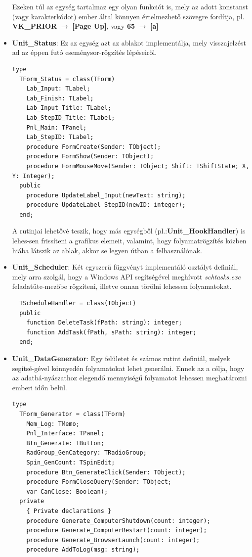 \begin{itemize}
{Ezeken túl az egység tartalmaz egy olyan funkciót is, mely az adott konstanst (vagy karakterkódot) ember által könnyen értelmezhető szövegre fordítja, pl. \textbf{VK\_PRIOR} $\rightarrow$ \textbf{[Page Up]}, vagy \textbf{65} $\rightarrow$ \textbf{[a]}

	}
	\item{
		\textbf{Unit\_Status}: Ez az egység azt az ablakot implementálja, mely visszajelzést ad az éppen futó eseménysor-rögzítés lépéseiről.
		\begin{lstlisting}
type
  TForm_Status = class(TForm)
    Lab_Input: TLabel;
    Lab_Finish: TLabel;
    Lab_Input_Title: TLabel;
    Lab_StepID_Title: TLabel;
    Pnl_Main: TPanel;
    Lab_StepID: TLabel;
    procedure FormCreate(Sender: TObject);
    procedure FormShow(Sender: TObject);
    procedure FormMouseMove(Sender: TObject; Shift: TShiftState; X, Y: Integer);
  public
    procedure UpdateLabel_Input(newText: string);
    procedure UpdateLabel_StepID(newID: integer);
  end;
		\end{lstlisting}

A rutinjai lehetővé teszik, hogy más egységből (pl.:\textbf{Unit\_HookHandler}) is lehes\hyp{}sen frissíteni a grafikus elemeit, valamint, hogy folyamatrögzítés közben hiába látszik az ablak, akkor se legyen útban a felhasználónak.
	}
	\item{
		\textbf{Unit\_Scheduler}: Két egyszerű függvényt implementáló osztályt definiál, mely arra szolgál, hogy a Windows API segítségével meghívott \textit{schtasks.exe} feladatüte\hyp{}mezőbe rögzíteni, illetve onnan törölni lehessen folyamatokat.
	\begin{lstlisting}
  TScheduleHandler = class(TObject)
  public
    function DeleteTask(fPath: string): integer;
    function AddTask(fPath, sPath: string): integer;
  end;
	\end{lstlisting}
	}
	\item{
		\textbf{Unit\_DataGenerator}: Egy felületet és számos rutint definiál, melyek segítsé\hyp{}gével könnyedén folyamatokat lehet generálni. Ennek az a célja, hogy az adatbá\hyp{}nyászathoz elegendő mennyiségű folyamatot lehessen meghatározni emberi időn belül.

	\begin{lstlisting}
type
  TForm_Generator = class(TForm)
    Mem_Log: TMemo;
    Pnl_Interface: TPanel;
    Btn_Generate: TButton;
    RadGroup_GenCategory: TRadioGroup;
    Spin_GenCount: TSpinEdit;
    procedure Btn_GenerateClick(Sender: TObject);
    procedure FormCloseQuery(Sender: TObject;
    var CanClose: Boolean);
  private
    { Private declarations }
    procedure Generate_ComputerShutdown(count: integer);
    procedure Generate_ComputerRestart(count: integer);
    procedure Generate_BrowserLaunch(count: integer);
    procedure AddToLog(msg: string);


\end{lstlisting}}
\end{itemize}
